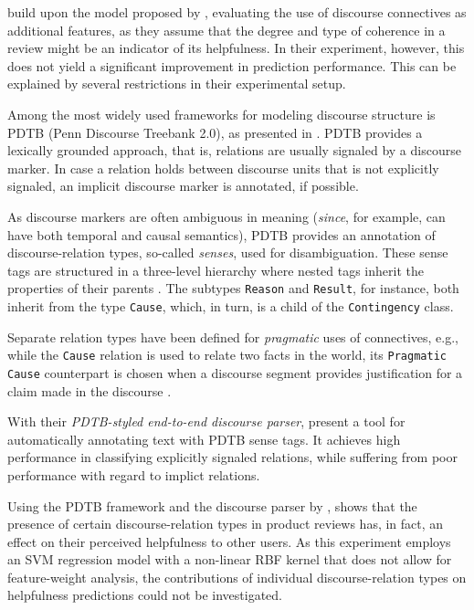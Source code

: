 \documentclass[
    a4paper,%
    12pt,%
    oneside,%
    toc=bibliography,
    final,
]{scrartcl}
\begin{document}
\citet{Mertz2014} build upon the model proposed by \citet{Kim2006}, evaluating the use of discourse connectives as additional features, as they assume that the degree and type of coherence in a review might be an indicator of its helpfulness. In their experiment, however, this does not yield a significant improvement in prediction performance. This can be explained by several restrictions in their experimental setup.

Among the most widely used frameworks for modeling discourse structure is PDTB (Penn Discourse Treebank 2.0), as presented in \citet{Prasad2008}. PDTB provides a lexically grounded approach, that is, relations are usually signaled by a discourse marker. In case a relation holds between discourse units that is not explicitly signaled, an implicit discourse marker is annotated, if possible.

As discourse markers are often ambiguous in meaning (\textit{since}, for example, can have both temporal and causal semantics), PDTB provides an annotation of discourse-relation types, so-called \textit{senses}, used for disambiguation. These sense tags are structured in a three-level hierarchy where nested tags inherit the properties of their parents \citep[cf.][5]{Prasad2008}. The subtypes \lstinline|Reason| and \lstinline|Result|, for instance, both inherit from the type \lstinline|Cause|, which, in turn, is a child of the \lstinline|Contingency| class.

Separate relation types have been defined for \textit{pragmatic} uses of connectives, e.g., while the \lstinline|Cause| relation is used to relate two facts in the world, its \lstinline|Pragmatic Cause| counterpart is chosen when a discourse segment provides justification for a claim made in the discourse \citep[cf.][29]{Prasad2007}.

With their \textit{PDTB-styled end-to-end discourse parser}, \citet{Lin2014} present a tool for automatically annotating text with PDTB sense tags. It achieves high performance in classifying explicitly signaled relations, while suffering from poor performance with regard to implict relations.

Using the PDTB framework and the discourse parser by \citet{Lin2014}, \citet{Golly2017} shows that the presence of certain discourse-relation types in product reviews has, in fact, an effect on their perceived helpfulness to other users. As this experiment employs an SVM regression model with a non-linear RBF kernel that does not allow for feature-weight analysis, the contributions of individual discourse-relation types on helpfulness predictions could not be investigated.
\end{document}
